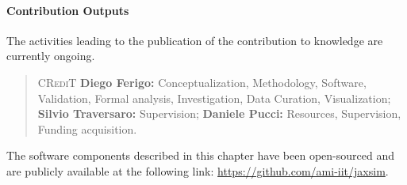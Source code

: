 \paragraph{Contribution Outputs}

The activities leading to the publication of the contribution to knowledge are currently ongoing.
%
\begin{quote}
    \textsc{CRediT} \hspace{2mm}
    \textbf{Diego Ferigo:} Conceptualization, Methodology, Software, Validation, Formal analysis, Investigation, Data Curation, Visualization;
    \textbf{Silvio Traversaro:} Supervision;
    \textbf{Daniele Pucci:} Resources, Supervision, Funding acquisition.
\end{quote}
%
The software components described in this chapter have been open-sourced and are publicly available at the following link: \url{https://github.com/ami-iit/jaxsim}.

